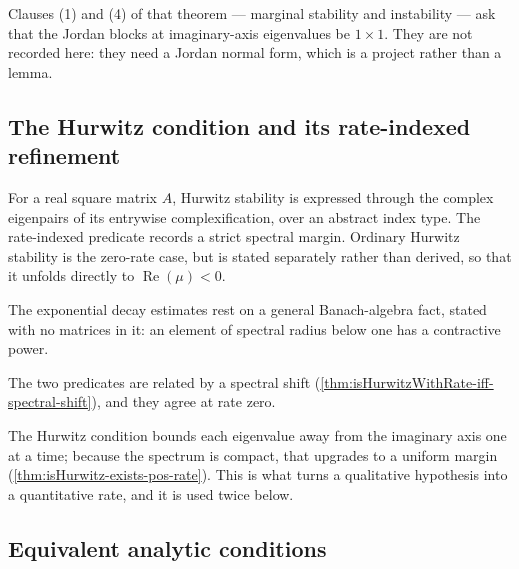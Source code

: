 Clauses (1) and (4) of that theorem --- marginal stability and instability --- ask that the
Jordan blocks at imaginary-axis eigenvalues be $1 \times 1$. They are not recorded here: they
need a Jordan normal form, which is a project rather than a lemma.

\subsection{The Hurwitz condition and its rate-indexed refinement}

For a real square matrix $A$, Hurwitz stability is expressed through the complex eigenpairs
of its entrywise complexification, over an abstract index type. The rate-indexed predicate
records a strict spectral margin. Ordinary Hurwitz stability is the zero-rate case, but is
stated separately rather than derived, so that it unfolds directly to
$\operatorname{Re}(\mu) < 0$.





The exponential decay estimates rest on a general Banach-algebra fact, stated with no matrices in
it: an element of spectral radius below one has a contractive power.


The two predicates are related by a spectral shift
(\cref{thm:isHurwitzWithRate-iff-spectral-shift}), and they agree at rate zero.





The Hurwitz condition bounds each eigenvalue away from the imaginary axis one at a time;
because the spectrum is compact, that upgrades to a uniform margin
(\cref{thm:isHurwitz-exists-pos-rate}). This is what turns a qualitative hypothesis into a
quantitative rate, and it is used twice below.

\subsection{Equivalent analytic conditions}

